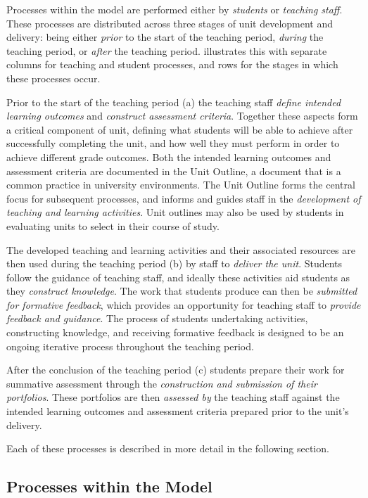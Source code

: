 Processes within the model are performed either by \emph{students} or \emph{teaching staff}. These processes are distributed across three stages of unit development and delivery: being either \emph{prior} to the start of the teaching period, \emph{during} the teaching period, or \emph{after} the teaching period.  illustrates this with separate columns for teaching and student processes, and rows for the stages in which these processes occur.

Prior to the start of the teaching period (a) the teaching staff \emph{define intended learning outcomes} and \emph{construct assessment criteria}. Together these aspects form a critical component of unit, defining what students will be able to achieve after successfully completing the unit, and how well they must perform in order to achieve different grade outcomes. Both the intended learning outcomes and assessment criteria are documented in the Unit Outline, a document that is a common practice in university environments. The Unit Outline forms the central focus for subsequent processes, and informs and guides staff in the \emph{development of teaching and learning activities}. Unit outlines may also be used by students in evaluating units to select in their course of study.

The developed teaching and learning activities and their associated resources are then used during the teaching period (b) by staff to \emph{deliver the unit}. Students follow the guidance of teaching staff, and ideally these activities aid students as they \emph{construct knowledge}. The work that students produce can then be \emph{submitted for formative feedback}, which provides an opportunity for teaching staff to \emph{provide feedback and guidance}. The process of students undertaking activities, constructing knowledge, and receiving formative feedback is designed to be an ongoing iterative process throughout the teaching period.

After the conclusion of the teaching period (c) students prepare their work for summative assessment through the \emph{construction and submission of their portfolios}. These portfolios are then \emph{assessed by} the teaching staff against the intended learning outcomes and assessment criteria prepared prior to the unit's delivery.

Each of these processes is described in more detail in the following section.


\subsection{Processes within the Model} %
\label{sub:processes_within_the_model}

